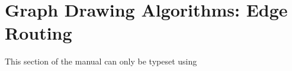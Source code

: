 %
%
%


\section{Graph Drawing Algorithms: Edge Routing}
\label{section-last-graphdrawing-library-in-manual}

{}

\label{section-gd-edge-routing}

\ifluatex
\else
    This section of the manual can only be typeset using 
    \expandafter\endinput
\fi


\includeluadocumentationof{pgf.gd.routing.library}
\includeluadocumentationof{pgf.gd.routing.NecklaceRouting}


